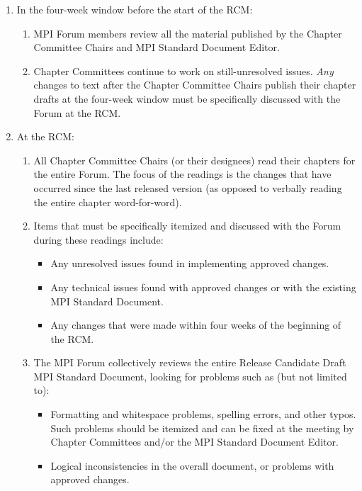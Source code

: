 \begin{enumerate}
\item In the four-week window before the start of the RCM:
  \begin{enumerate}
  \item MPI Forum members review all the material published by the
    Chapter Committee Chairs and MPI Standard Document Editor.
  \item Chapter Committees continue to work on still-unresolved
    issues.  {\em Any} changes to text after the Chapter
      Committee Chairs publish their chapter drafts at the four-week
    window must be specifically discussed with the Forum at the RCM.
  \end{enumerate}

\item At the RCM:
  \begin{enumerate}
  \item All Chapter Committee Chairs (or their designees) read their
    chapters for the entire Forum.  The focus of the readings is the
    changes that have occurred since the last released version (as
    opposed to verbally reading the entire chapter word-for-word).
  \item Items that must be specifically itemized and discussed with
    the Forum during these readings include:
    \begin{itemize}
    \item Any unresolved issues found in implementing approved
      changes.
    \item Any technical issues found with approved changes or with the
      existing MPI Standard Document.
    \item Any changes that were made within four weeks of the
      beginning of the RCM.
    \end{itemize}

  \item The MPI Forum collectively reviews the entire Release
    Candidate Draft MPI Standard Document, looking for problems such
    as (but not limited to):
    \begin{itemize}
    \item Formatting and whitespace problems, spelling errors, and
      other typos.  Such problems should be itemized and can be fixed
      at the meeting by Chapter Committees and/or the MPI Standard
      Document Editor.
    \item Logical inconsistencies in the overall document, or problems
      with approved changes.
    \end{itemize}


\end{enumerate}
\end{enumerate}
